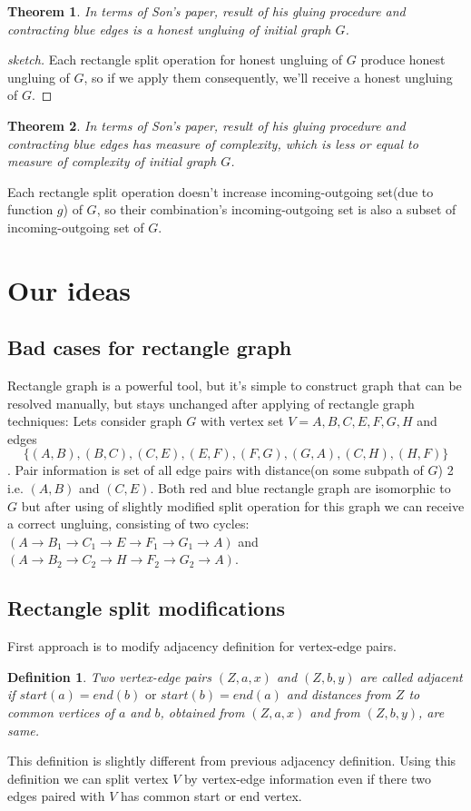 \documentclass[12pt,a4paper,oneside]{article}
\newtheorem{theorem}{Theorem}
\newtheorem{definition}{Definition}
\begin{document}
\begin{theorem}
  In terms of Son's paper, result of his gluing procedure and contracting blue edges is a honest ungluing of initial graph $G$. 
\end{theorem}
\begin{proof}[sketch]
Each rectangle split operation for honest ungluing of $G$ produce honest ungluing of $G$, so if we apply them consequently, we'll receive a honest ungluing of $G$.
\end{proof}
\begin{theorem}
  In terms of Son's paper, result of his gluing procedure and contracting blue edges has measure of complexity, which is less or equal to measure of complexity of initial graph $G$. 
\end{theorem}
Each rectangle split operation  doesn't increase incoming-outgoing set(due to function $g$) of $G$, so their combination's incoming-outgoing set is also a subset of incoming-outgoing set of $G$.


\section{Our ideas}

\subsection{Bad cases for rectangle graph}
Rectangle graph is a powerful tool, but it's simple to construct graph that can be resolved manually, but stays unchanged after applying of rectangle graph techniques:
Lets consider graph $G$ with vertex set $V = {A,B,C,E,F,G,H}$ and edges $$\{(A,B),(B,C),(C,E),(E,F),(F,G),(G,A),(C,H),(H,F)\}$$. Pair information is set of all edge pairs with distance(on some subpath of $G$) 2 i.e. $(A,B)$ and $(C,E)$.
Both red and blue rectangle graph are isomorphic to $G$ but after using of slightly modified split operation for this graph we can receive a correct ungluing, consisting of two cycles: $(A\rightarrow B_1\rightarrow C_1\rightarrow E\rightarrow F_1\rightarrow G_1\rightarrow A)$ and $(A\rightarrow B_2\rightarrow C_2\rightarrow H\rightarrow F_2\rightarrow G_2\rightarrow A)$.

\subsection{Rectangle split modifications}
First approach is to modify adjacency definition for vertex-edge pairs.
\begin{definition}
 Two vertex-edge pairs $(Z,a,x)$ and $(Z,b,y)$ are called \emph{adjacent} if $ start (a) = end(b)\text{ or } start(b) = end (a)$ and distances from $Z$ to common vertices of $a$ and $b$, obtained from $(Z,a,x)$ and from $(Z,b,y)$, are same. 
\end{definition}
This definition  is slightly different from previous adjacency definition. Using this definition we can split vertex $V$ by vertex-edge information even if there two edges paired with $V$ has common start or end vertex.   
\end{document}
